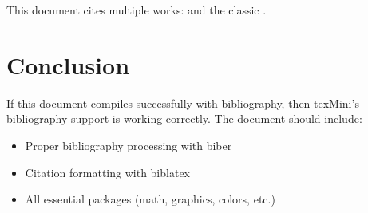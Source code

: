 \documentclass[11pt]{article}
\begin{document}
This document cites multiple works: \cite{testwork2024} and the classic \cite{knuth1984texbook}.

\section{Conclusion}

If this document compiles successfully with bibliography, then texMini's bibliography support is working correctly. The document should include:

\begin{itemize}
    \item Proper bibliography processing with biber
    \item Citation formatting with biblatex
    \item All essential packages (math, graphics, colors, etc.)
\end{itemize}

\printbibliography
\end{document}
